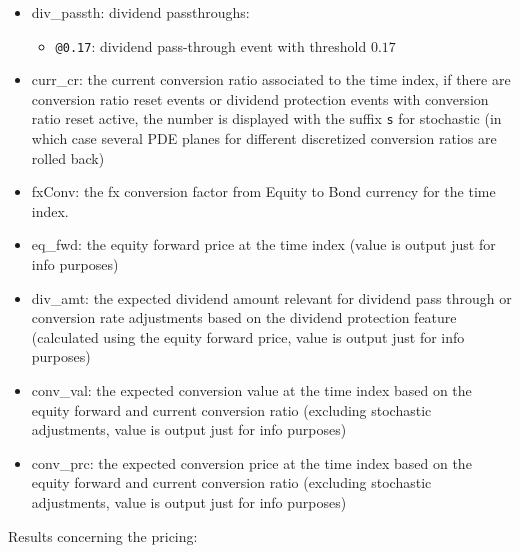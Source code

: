 \begin{itemize}
\begin{itemize}
    conversion price
  \item \verb+0.8@0.9/CPT+ as before, but reference price is the current conversion price
  \item \verb+DP(i,0.23)@0.17+ dividend protection conversion ratio reset, relevant period starts at time index $i+1$,
    dividend yield over relevant period (without historical dividends) is $0.23$, threshold is $0.17$
  \end{itemize}
\item div\_passth: dividend passthroughs:
  \begin{itemize}
    \item \verb+@0.17+: dividend pass-through event with threshold $0.17$
  \end{itemize}
\item curr\_cr: the current conversion ratio associated to the time index, if there are conversion ratio reset events or
  dividend protection events with conversion ratio reset active, the number is displayed with the suffix \verb+s+ for
  stochastic (in which case several PDE planes for different discretized conversion ratios are rolled back)
\item fxConv: the fx conversion factor from Equity to Bond currency for the time index.
\item eq\_fwd: the equity forward price at the time index (value is output just for info purposes)
\item div\_amt: the expected dividend amount relevant for dividend pass through or conversion rate adjustments based on
  the dividend protection feature (calculated using the equity forward price, value is output just for info purposes)
\item conv\_val: the expected conversion value at the time index based on the equity forward and current conversion
  ratio (excluding stochastic adjustments, value is output just for info purposes)
\item conv\_prc: the expected conversion price at the time index based on the equity forward and current conversion
  ratio (excluding stochastic adjustments, value is output just for info purposes)
\end{itemize}

Results concerning the pricing:

